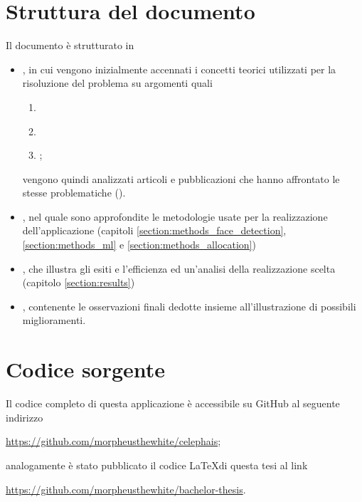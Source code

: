 \section{Struttura del documento}
\label{section:doc_structure}

Il documento è strutturato in 

\begin{itemize}
    \item \textbf{}, in cui vengono inizialmente accennati i concetti teorici utilizzati per la risoluzione 
        del problema su argomenti quali
        \begin{enumerate}
            \item \textbf{}
            \item \textbf{} 
            \item \textbf{}; 
        \end{enumerate}

        vengono quindi analizzati articoli e pubblicazioni che hanno affrontato le stesse problematiche 
        (\textbf{}).
        
    \item \textbf{}, nel quale sono approfondite le metodologie usate per la realizzazione 
        dell'applicazione (capitoli \ref{section:methods_face_detection}, \ref{section:methods_ml} e \ref{section:methods_allocation})
    \item \textbf{}, che illustra gli esiti e l'efficienza ed un'analisi della realizzazione scelta (capitolo 
        \ref{section:results})
    \item \textbf{}, contenente le osservazioni finali dedotte insieme all'illustrazione di possibili 
        miglioramenti.
\end{itemize}

\section{Codice sorgente}

Il codice completo di questa applicazione è accessibile su GitHub al seguente 
indirizzo 

\begin{center}
    \url{https://github.com/morpheusthewhite/celephais}; 
\end{center}

\noindent
analogamente è stato pubblicato il codice \LaTeX di questa tesi al link 

\begin{center}
    \url{https://github.com/morpheusthewhite/bachelor-thesis}.     
\end{center}
